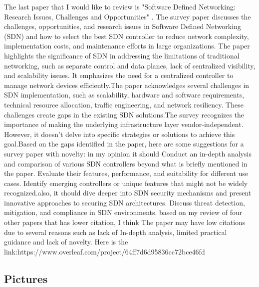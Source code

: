 \documentclass{article}
\begin{document}
\begin{tex}
The last paper that I would like to review is "Software Defined Networking: Research Issues, Challenges and Opportunities" \cite{mishra2017software}. The survey paper discusses the challenges, opportunities, and research issues in Software Defined Networking (SDN) and how to select the best SDN controller to reduce network complexity, implementation costs, and maintenance efforts in large organizations. The paper highlights the significance of SDN in addressing the limitations of traditional networking, such as separate control and data planes, lack of centralized visibility, and scalability issues. It emphasizes the need for a centralized controller to manage network devices efficiently.The paper acknowledges several challenges in SDN implementation, such as scalability, hardware and software requirements, technical resource allocation, traffic engineering, and network resiliency. These challenges create gaps in the existing SDN solutions.The survey recognizes the importance of making the underlying infrastructure layer vendor-independent. However, it doesn't delve into specific strategies or solutions to achieve this goal.Based on the gaps identified in the paper, here are some suggestions for a survey paper with novelty: in my opinion it should Conduct an in-depth analysis and comparison of various SDN controllers beyond what is briefly mentioned in the paper. Evaluate their features, performance, and suitability for different use cases. Identify emerging controllers or unique features that might not be widely recognized.also, it should dive deeper into SDN security mechanisms and present innovative approaches to securing SDN architectures. Discuss threat detection, mitigation, and compliance in SDN environments.
based on my review of four other papers that has lower citation, I think The paper may have low citations due to several reasons such as lack of In-depth analysis, limited practical guidance and lack of novelty. 
Here is the link:https://www.overleaf.com/project/64ff7d6d95836cc72bce46fd
\end{tex}
   




\subsection{Pictures }
\end{document}
